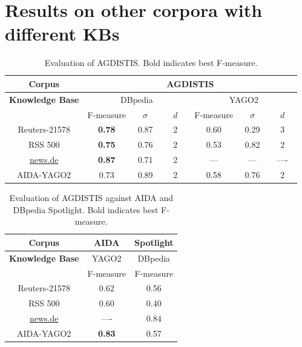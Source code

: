\documentclass[11pt,letterpaper]{article}
\begin{document}
\section*{Results on other corpora with different KBs}
\begin{table}[htb!]
\centering
\caption{Evaluation of AGDISTIS. Bold indicates best \mbox{F-measure}.} 
\begin{tabular}{c ccc ccc}
\toprule
\textbf{Corpus}  & \multicolumn{6}{c}{\textbf{AGDISTIS}}	\\\midrule
\textbf{Knowledge Base}& \multicolumn{3}{c}{{DBpedia}}& \multicolumn{3}{c}{{YAGO2}}\\\midrule
				& \mbox{F-measure} 		& $\quad \sigma \quad $ & $\quad d \quad $ 	& \mbox{F-measure} & $\quad \sigma \quad $ & $\quad d \quad $ \\
\cmidrule(r){2-4}  \cmidrule(r){5-7} 
Reuters-21578	&  	\textbf{0.78}	&  			0.87		&  		2			& 	0.60	&  0.29		&  	3	\\
RSS 500 		&  	\textbf{0.75}	&  			0.76		&  		2			& 	0.53	&  0.82		&   2 	\\
\url{news.de} 	&  	\textbf{0.87}	&  			0.71		&  		2			& 	---		&   ---		&  ----	\\
AIDA-YAGO2	   	&  		0.73		&  			0.89		&  		2			& 	0.58	&  0.76		&   2 	\\
\bottomrule
\end{tabular}
\end{table}
\begin{table}[htb!]
\centering
\caption{Evaluation of AGDISTIS against AIDA and DBpedia Spotlight. Bold indicates best \mbox{F-measure}.} 
\begin{tabular}{c  c c}
\toprule
\textbf{Corpus}  	& \textbf{AIDA} & \textbf{Spotlight}\\\midrule
\textbf{Knowledge Base}& {YAGO2} & {DBpedia}\\\midrule
				&  \mbox{F-measure}  & \mbox{F-measure}\\
\cmidrule{8-8} \cmidrule{9-9}
Reuters-21578	&  	0.62		& 	0.56	\\
RSS 500 		&  	0.60		& 	0.40	\\
\url{news.de} 	&  	----		& 	0.84	\\
AIDA-YAGO2	   	&\textbf{0.83}	& 	0.57	\\
\bottomrule
\end{tabular}
\end{table}

\clearpage
\end{document}
